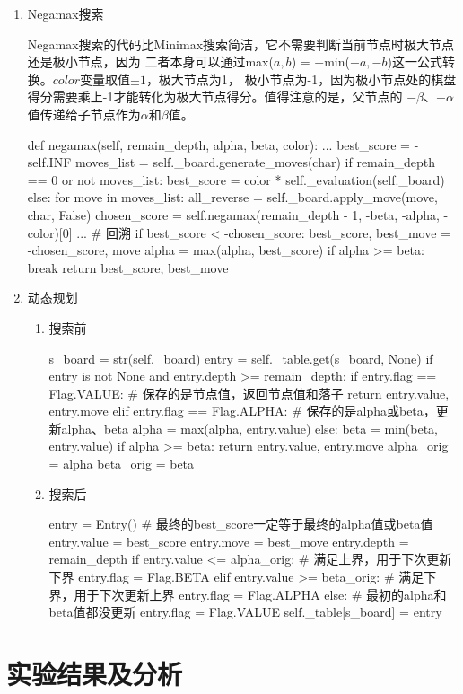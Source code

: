 \documentclass[10pt,letterpaper]{ctexart}
\begin{document}
\begin{enumerate}[itemindent=2.5em,label=\arabic*、]
  \item Negamax搜索
  \par \qquad Negamax搜索的代码比Minimax搜索简洁，它不需要判断当前节点时极大节点还是极小节点，因为
  二者本身可以通过max($a,b$) = $-$min($-a, -b$)这一公式转换。$color$变量取值$\pm 1$，极大节点为1，
  极小节点为-1，因为极小节点处的棋盘得分需要乘上-1才能转化为极大节点得分。值得注意的是，父节点的
  $-\beta$、$-\alpha$值传递给子节点作为$\alpha$和$\beta$值。
\begin{python}
def negamax(self, remain_depth, alpha, beta, color):
  ...
  best_score = -self.INF
  moves_list = self._board.generate_moves(char)
  if remain_depth == 0 or not moves_list:
      best_score = color * self._evaluation(self._board)
  else:
    for move in moves_list:
      all_reverse = self._board.apply_move(move, char, False)
      chosen_score = self.negamax(remain_depth - 1, -beta, -alpha, -color)[0]
      ... # 回溯
      if best_score < -chosen_score:
          best_score, best_move = -chosen_score, move
      alpha = max(alpha, best_score)
      if alpha >= beta:
          break
  return best_score, best_move
\end{python}
  \item 动态规划
  \begin{enumerate}[itemindent=3.5em,label=(\arabic*)]
    \item 搜索前
      \begin{python}
  s_board = str(self._board)
  entry = self._table.get(s_board, None)
  if entry is not None and entry.depth >= remain_depth:
      if entry.flag == Flag.VALUE:    # 保存的是节点值，返回节点值和落子
          return entry.value, entry.move
      elif entry.flag == Flag.ALPHA:   # 保存的是alpha或beta，更新alpha、beta
          alpha = max(alpha, entry.value)
      else:
          beta = min(beta, entry.value)
      if alpha >= beta:
          return entry.value, entry.move
  alpha_orig = alpha
  beta_orig = beta
      \end{python}
    \item 搜索后
      \begin{python}
  entry = Entry()
  # 最终的best_score一定等于最终的alpha值或beta值
  entry.value = best_score
  entry.move = best_move
  entry.depth = remain_depth
  if entry.value <= alpha_orig:   # 满足上界，用于下次更新下界
      entry.flag = Flag.BETA
  elif entry.value >= beta_orig:  # 满足下界，用于下次更新上界
      entry.flag = Flag.ALPHA
  else:                           # 最初的alpha和beta值都没更新
      entry.flag = Flag.VALUE
  self._table[s_board] = entry
      \end{python}
  \end{enumerate}
\end{enumerate}
\section{实验结果及分析}
\end{document}
